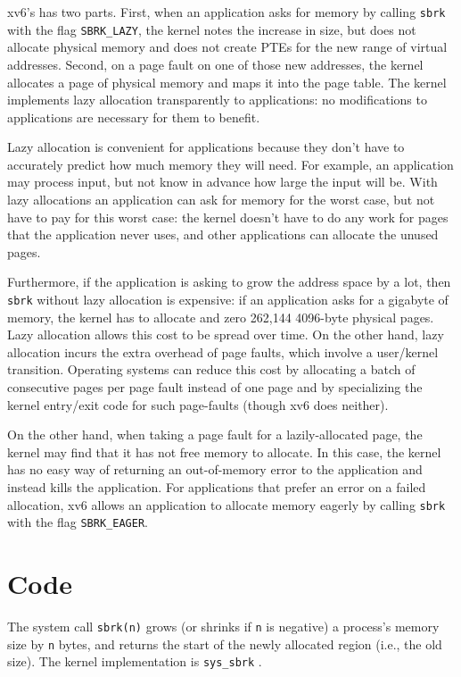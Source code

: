 xv6's  has two parts.
First, when an application asks for memory by calling
\lstinline{sbrk} with the flag \lstinline{SBRK_LAZY}, the kernel notes the increase in size, but does not
allocate physical memory and does not create PTEs for the new range of
virtual addresses.  Second, on a page fault on one of those new
addresses, the kernel allocates a page of physical memory and maps it
into the page table.  The kernel implements lazy allocation
transparently to applications: no modifications to applications are
necessary for them to benefit.

Lazy allocation is convenient for applications because they don't have
to accurately predict how much memory they will need.  For example, an
application may process input, but not know in advance how large the
input will be.  With lazy allocations an application can ask for
memory for the worst case, but not have to pay for this worst case:
the kernel doesn't have to do any work for pages that the
application never uses, and other applications can allocate the unused
pages.

Furthermore, if the application is asking to grow the address space by
a lot, then \lstinline{sbrk} without lazy allocation is expensive: if
an application asks for a gigabyte of memory, the kernel has to
allocate and zero 262,144 4096-byte physical pages.  Lazy allocation allows
this cost to be spread over time.  On the other hand, lazy allocation
incurs the extra overhead of page faults, which involve a user/kernel
transition.  Operating systems can reduce this cost by allocating a
batch of consecutive pages per page fault instead of one page and by
specializing the kernel entry/exit code for such page-faults (though
xv6 does neither).

On the other hand, when taking a page fault for a lazily-allocated
page, the kernel may find that it has not free memory to allocate.  In
this case, the kernel has no easy way of returning an out-of-memory
error to the application and instead kills the application.  For
applications that prefer an error on a failed allocation, xv6 allows
an application to allocate memory eagerly by calling \lstinline{sbrk}
with the flag \lstinline{SBRK_EAGER}.

\section{Code}

The system call {\tt sbrk(n)} grows (or shrinks if {\tt n}
is negative) a process's memory size by {\tt n} bytes, and returns
the start of the newly allocated region (i.e., the old size).
The kernel implementation is \lstinline{sys_sbrk}
.

